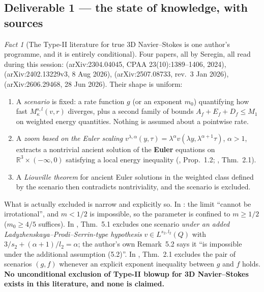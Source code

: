 \documentclass[11pt]{article}
\theoremstyle{definition}
\theoremstyle{remark}
\newtheorem{fact}[theorem]{Fact}
\newcommand{\R}{\mathbb{R}}
\begin{document}
\subsection{Deliverable 1 --- the state of knowledge, with sources}
\label{subsec:wpt1-known}

\begin{fact}[The Type-II literature for true 3D Navier--Stokes is one
  author's programme, and it is entirely conditional]
  \label{fact:wpt1-seregin}
  Four papers, all by Seregin, all read during this session:
  \cite{Seregin2024TypeII} (arXiv:2304.04045, CPAA 23(10):1389--1406, 2024),
  \cite{Seregin2026Axisym} (arXiv:2402.13229v3, 8 Aug 2026),
  \cite{Seregin2026Scenarios} (arXiv:2507.08733, rev.\ 3 Jan 2026),
  \cite{Seregin2026Potential} (arXiv:2606.29468, 28 Jun 2026). Their shape is
  uniform:
  \begin{enumerate}[label=(\alph*)]
    \item A \emph{scenario} is fixed: a rate function $g$ (or an exponent
      $m_0$) quantifying how fast $M^{s,l}_\kappa(v,r)$ diverges, plus a
      second family of bounds $A_f+E_f+D_f\leq M_1$ on weighted energy
      quantities. Nothing is assumed about a pointwise rate.
    \item A \emph{zoom based on the Euler scaling}
      $v^{\lambda,\alpha}(y,\tau)=\lambda^\alpha v(\lambda y,
      \lambda^{\alpha+1}\tau)$, $\alpha>1$, extracts a nontrivial ancient
      solution of the \textbf{Euler} equations on $\R^3\times(-\infty,0)$
      satisfying a local energy inequality
      (\cite{Seregin2024TypeII}, Prop.~1.2; \cite{Seregin2026Potential},
      Thm.~2.1).
    \item A \emph{Liouville theorem} for ancient Euler solutions in the
      weighted class defined by the scenario then contradicts nontriviality,
      and the scenario is excluded.
  \end{enumerate}
  What is actually excluded is narrow and explicitly so. In
  \cite{Seregin2024TypeII}: the limit ``cannot be irrotational'', and $m<1/2$
  is impossible, so the parameter is confined to $m\geq1/2$
  ($m_0\geq4/5$ suffices). In \cite{Seregin2026Scenarios}, Thm.~5.1 excludes
  one scenario \emph{under an added Ladyzhenskaya--Prodi--Serrin-type
  hypothesis} $v\in L^{s_2,l_2}(Q)$ with $3/s_2+(\alpha+1)/l_2=\alpha$; the
  author's own Remark~5.2 says it ``is impossible under the additional
  assumption (5.2)''. In \cite{Seregin2026Potential}, Thm.~2.1 excludes the
  pair of scenarios $(g,f)$ whenever an explicit exponent inequality between
  $g$ and $f$ holds.
  \textbf{No unconditional exclusion of Type-II blowup for 3D Navier--Stokes
  exists in this literature, and none is claimed.}
\end{fact}
\end{document}
